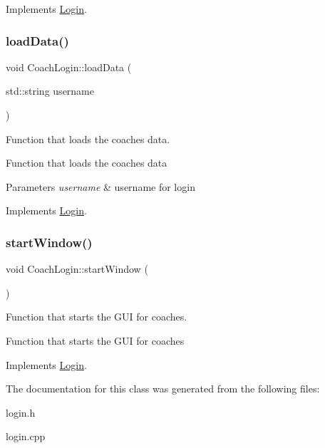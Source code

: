 Implements \mbox{\hyperlink{classLogin_afaf4316c2ce2eef1e645d8472d7e9ccd}{Login}}.

\mbox{\label{classCoachLogin_a7b4a4bc451520e54bdba247204dd072d}} 
\subsubsection{\texorpdfstring{loadData()}{loadData()}}
{\footnotesize\ttfamily void Coach\+Login\+::load\+Data (\begin{DoxyParamCaption}\item[{std\+::string}]{username }\end{DoxyParamCaption})\hspace{0.3cm}{\ttfamily [virtual]}}



Function that loads the coaches data. 

Function that loads the coaches data 
\begin{DoxyParams}{Parameters}
{\em username} & username for login \\
\hline
\end{DoxyParams}


Implements \mbox{\hyperlink{classLogin_aaa5bbdeef3c24022901a294af5f2be39}{Login}}.

\mbox{\label{classCoachLogin_ab6357836d5e7cb4b82bca85a1f5c67a0}} 
\subsubsection{\texorpdfstring{startWindow()}{startWindow()}}
{\footnotesize\ttfamily void Coach\+Login\+::start\+Window (\begin{DoxyParamCaption}{ }\end{DoxyParamCaption})\hspace{0.3cm}{\ttfamily [virtual]}}



Function that starts the G\+UI for coaches. 

Function that starts the G\+UI for coaches 

Implements \mbox{\hyperlink{classLogin_a91bc4d81c3d966d97320a988af1c4363}{Login}}.



The documentation for this class was generated from the following files\+:\begin{DoxyCompactItemize}
\item 
login.\+h\item 
login.\+cpp\end{DoxyCompactItemize}
